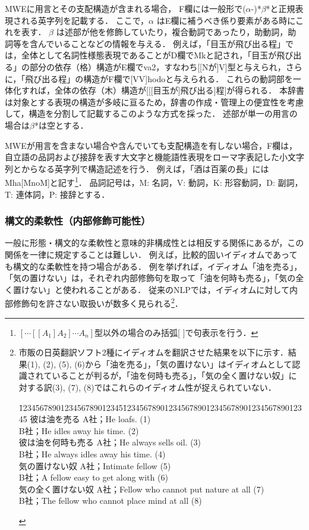 \documentclass[japanese]{jnlp_1.4}
\begin{document}
MWEに用言とその支配構造が含まれる場合，
F欄には一般形で($\alpha$-)*$\beta$*と正規表現される英字列を記載する．
ここで，$\alpha$ はE欄に補うべき係り要素がある時にこれを表す．
$\beta$ は述部が他を修飾していたり，複合動詞であったり，助動詞，助詞等を含んでいることなどの情報を与える．
例えば，「目玉が飛び出る程」では，全体として名詞性様態表現であることがD欄でMkと記され，「目玉が飛び出る」の部分の依存（格）構造がE欄でva2，すなわち[[Nが]V]型と与えられ，さらに，「飛び出る程」の構造がF欄で[VV]hodoと与えられる．
これらの動詞部を一体化すれば，全体の依存（木）構造が[[[目玉が]飛び出る]程]が得られる．
本辞書は対象とする表現の構造が多岐に亘るため，辞書の作成・管理上の便宜性を考慮して，構造を分割して記載するこのような方式を採った．
述部が単一の用言の場合は$\beta$*は空とする．


MWEが用言を含まない場合や含んでいても支配構造を有しない場合，F欄は，自立語の品詞および接辞を表す大文字と機能語性表現をローマ字表記した小文字列とからなる英字列で構造記述を行う．
例えば，「酒は百薬の長」にはMha[MnoM]と記す\footnote{$[\cdots [[A_{1}]A_{2}] \cdots A_{n}]$型以外の場合のみ括弧[ ]で句表示を行う．}．
品詞記号は，M: 名詞，V: 動詞，K: 形容動詞，D: 副詞，T: 連体詞，P: 接辞とする．


\subsubsection{構文的柔軟性（内部修飾可能性）}

一般に形態・構文的な柔軟性と意味的非構成性とは相反する関係にあるが，この関係を一律に規定することは難しい．
例えば，比較的固いイディオムであっても構文的な柔軟性を持つ場合がある．
例を挙げれば，イディオム「油を売る」，「気の置けない」は，それぞれ内部修飾句を取って「油を何時も売る」，「気の全く置けない」と使われることがある． 
従来のNLPでは，イディオムに対して内部修飾句を許さない取扱いが数多く見られる\footnote{市販の日英翻訳ソフト2種にイディオムを翻訳させた結果を以下に示す．結果(1), (2), (5), (6)から「油を売る」，「気の置けない」はイディオムとして認識されていることが判るが，「油を何時も売る」，「気の全く置けない奴」に対する訳(3), (7), (8)ではこれらのイディオム性が捉えられていない．
\begin{tabbing}
\hspace{30pt}\=1234567890123456789012345\=123456789012345678901234567890123456789012345\=\kill
\> 彼は油を売る \> A社；He loafs. \> (1) \\
\> \> B社；He idles away his time. \> (2) \\
\> 彼は油を何時も売る	\> A社；He always sells oil. \> (3) \\
\> \> B社；He always idles away his time.	\> (4) \\
\> 気の置けない奴 \> A社；Intimate fellow	\> (5) \\
\> \> B社；A fellow easy to get along with \> (6) \\
\> 気の全く置けない奴	\> A社；Fellow who cannot put nature at all	\> (7) \\
\> \> B社；The fellow who cannot place mind at all \> (8) 
\end{tabbing}}．
\end{document}
